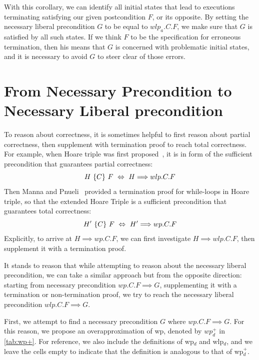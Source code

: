 With this corollary, we can identify all initial states that lead to executions terminating satisfying our given postcondition $F$, or its opposite. 
By setting the necessary liberal precondition $G$ to be equal to $wlp_a.C.F$, we make sure that $G$ is satisfied by all such states. 
If we think $F$ to be the specification for erroneous termination, then his means that $G$ is concerned with  problematic initial states, and it is necessary to avoid $G$ to steer clear of those errors. 

\section{From Necessary Precondition to Necessary Liberal precondition}\label{sec:np-nlp}
To reason about correctness, it is sometimes helpful to first reason about partial correctness, then supplement with termination proof to reach total correctness. 
For example, when Hoare triple was first proposed~\cite{hoare69}, it is in form of the sufficient precondition that guarantees partial correctness: 
$$\hoarenm{H}C F\ \Leftrightarrow\  H{\implies} wlp.C.F$$
Then Manna and Pnueli~\cite{manna74} provided a termination proof for while-loops in Hoare triple, so that the extended Hoare Triple is a sufficient precondition that guarantees total correctness: 
$$\hoarenm{H'}C F\ \Leftrightarrow\ H'{\implies} wp.C.F$$
Explicitly, to arrive at $H\implies wp.C.F$, we can first investigate $H\implies wlp.C.F$, then supplement it with a termination proof.

It stands to reason that while attempting to reason about the necessary liberal precondition, we can take a similar approach but from the opposite direction: starting from necessary precondition $wp.C.F \implies G$, supplementing it with a termination or non-termination proof, we try to reach the necessary liberal precondition $wlp.C.F\implies G$. 

\newcommand{\wpp}{wp_d^+}
First, we attempt to find a necessary precondition $G$ where $ wp.C.F\implies G$. 
For this reason, we propose an overapproximation of wp, denoted by $\wpp$ in \autoref{tab:wp+}. 
For reference, we also include the definitions of wp$_d$ and wlp$_d$, and we leave the cells empty to indicate that the definition is analogous to that of wp$_d^+$. 

